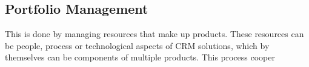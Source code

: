 	
	
	
	\subsection{Portfolio Management}
		\label{sec:portmang}
		
		This is done by managing resources that make up products. These resources can be people, process or technological aspects of \acrshort{CRM} solutions, which by themselves can be components of multiple products. This process
	cooper
	\citep{cooper1999new}
	
